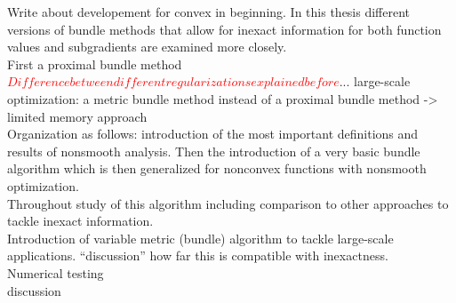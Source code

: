 Write about developement for convex in beginning.
In this thesis different versions of bundle methods that allow for inexact information for both function values and subgradients are examined more closely. \\
First a proximal bundle method \textcolor{red}{\(Difference between different regularizations explained before\)}...
large-scale optimization: a metric bundle method instead of a proximal bundle method -> limited memory approach \\
Organization as follows: introduction of the most important definitions and results of nonsmooth analysis. Then the introduction of a very basic bundle algorithm which is then generalized for nonconvex functions with nonsmooth optimization. \\
Throughout study of this algorithm including comparison to other approaches to tackle inexact information. \\
Introduction of variable metric (bundle) algorithm to tackle large-scale applications. ``discussion'' how far this is compatible with inexactness. \\
Numerical testing \\ 
discussion \\



